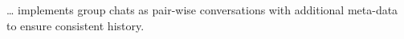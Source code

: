 \citet{multiotr2009} \dots
\citet{TextSecure} implements group chats as pair-wise conversations with 
additional meta-data to ensure consistent history.



